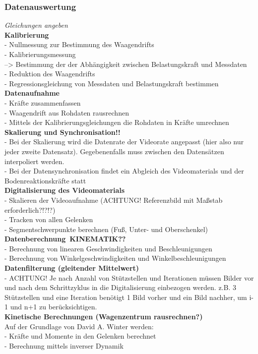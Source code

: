 \subsubsection{Datenauswertung}
\textit{Gleichungen angeben}\\
\textbf{Kalibrierung}\\
- Nullmessung zur Bestimmung des Waagendrifts\\
- Kalibrierungsmessung\\
--> Bestimmung der der Abhängigkeit zwischen Belastungskraft und Messdaten\\
- Reduktion des Waagendrifts\\
- Regressionsgleichung von Messdaten und Belastungskraft bestimmen\\
\textbf{Datenaufnahme}\\
- Kräfte zusammenfassen\\
- Waagendrift aus Rohdaten rausrechnen\\
- Mittels der Kalibrierungsgleichungen die Rohdaten in Kräfte umrechnen\\
\textbf{Skalierung und Synchronisation!!}\\
- Bei der Skalierung wird die Datenrate der Videorate angepasst (hier also nur jeder zweite Datensatz). Gegebenenfalls muss zwischen den Datensätzen interpoliert werden.\\
- Bei der Datensynchronisation findet ein Abgleich des Videomaterials und der Bodenreaktionskräfte statt\\
\textbf{Digitalisierung des Videomaterials}\\
- Skalieren der Videoaufnahme (ACHTUNG! Referenzbild mit Maßstab erforderlich?!?!?)\\
- Tracken von allen Gelenken\\
- Segmentschwerpunkte berechnen (Fuß, Unter- und Oberschenkel)\\
\textbf{Datenberechnung\ KINEMATIK??}\\
- Berechnung von linearen Geschwindigkeiten und Beschleunigungen\\
- Berechnung von Winkelgeschwindigkeiten und Winkelbeschleunigungen\\
\textbf{Datenfilterung (gleitender Mittelwert)}\\
- ACHTUNG! Je nach Anzahl von Stützstellen und Iterationen müssen Bilder vor und nach dem Schrittzyklus in die Digitalisierung einbezogen werden. z.B. 3 Stützstellen und eine Iteration benötigt 1 Bild vorher und ein Bild nachher, um i-1 und n+1 zu berücksichtigen.\\
\textbf{Kinetische Berechnungen (Wagenzentrum rausrechnen?)}\\
Auf der Grundlage von David A. Winter werden:\\
- Kräfte und Momente in den Gelenken berechnet\\
- Berechnung mittels inverser Dynamik\\